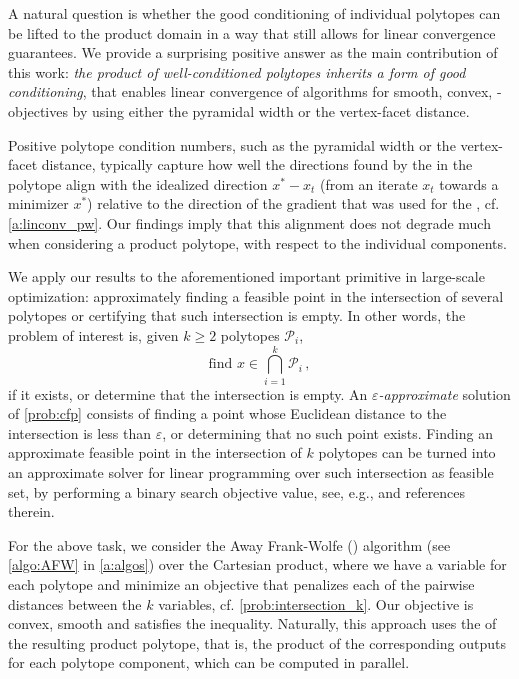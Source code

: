 \documentclass[twoside]{article}
\newcommand{\R}{\mathbb{R}}
\newcommand{\mP}{\mathcal{P}}
\let\epsilon\varepsilon
\begin{document}
A natural question is whether the good conditioning of individual polytopes can be lifted to the product domain in a way that still allows for linear convergence guarantees. We provide a surprising positive answer as the main contribution of this work: \emph{the product of well-conditioned polytopes inherits a form of good conditioning}, that enables linear convergence of \FW{} algorithms for smooth, convex, \PL{}-objectives by using either the pyramidal width or the vertex-facet distance.

Positive polytope condition numbers, such as the pyramidal width or the vertex-facet distance, typically capture how well the directions found by the \LMO{} in the polytope align with the idealized direction $x^\ast - x_t$ (from an iterate $x_t$ towards a minimizer $x^\ast$) relative to the direction of the gradient that was used for the \LMO{}, cf. \cref{a:linconv_pw}. Our findings imply that this alignment does not degrade much when considering a product polytope, with respect to the individual components.

We apply our results to the aforementioned important primitive in large-scale optimization: approximately finding a feasible point in the intersection of several polytopes or certifying that such intersection is empty. In other words, the problem of interest is, given $k \geq 2$ polytopes $\mP_i$,
\begin{equation}
\text{find } x \in \bigcap_{i=1}^k \mathcal{P}_i\,, \tag{P}
\label{prob:cfp}
\end{equation}
if it exists, or determine that the intersection is empty. An  \emph{$\epsilon$-approximate} solution of \eqref{prob:cfp} consists of finding a point whose Euclidean distance to the intersection is less than $\epsilon$, or determining that no such point exists. Finding an approximate feasible point in the intersection of $k$ polytopes can be turned into an approximate solver for linear programming over such intersection as feasible set, by performing a binary search objective value, see, e.g., \citep{DVZ22} and references therein.

For the above task, we consider the Away Frank-Wolfe () algorithm \citep{GM86} (see \cref{algo:AFW} in \cref{a:algos}) over the Cartesian product, where we have a variable for each polytope and minimize an objective that penalizes each of the pairwise distances between the $k$ variables, cf. \eqref{prob:intersection_k}. Our objective is convex, smooth and satisfies the \PL{} inequality. Naturally, this approach uses the \LMO{} of the resulting product polytope, that is, the product of the corresponding  \LMO{} outputs for each polytope component, which can be computed in parallel.
\end{document}
